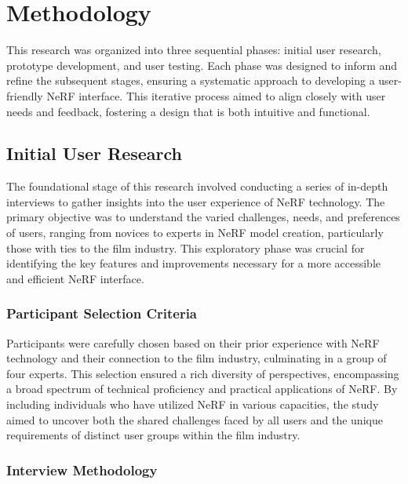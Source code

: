 %
\chapter{Methodology}
\label{sec:methodology}

This research was organized into three sequential phases: initial user research, prototype development, and user testing. 
Each phase was designed to inform and refine the subsequent stages, ensuring a systematic approach to developing a user-friendly NeRF interface. 
This iterative process aimed to align closely with user needs and feedback, fostering a design that is both intuitive and functional.

\section{Initial User Research}
\label{sec:methodology:user-research}

The foundational stage of this research involved conducting a series of in-depth interviews to gather insights into the user experience of NeRF technology. 
The primary objective was to understand the varied challenges, needs, and preferences of users, ranging from novices to experts in NeRF model creation, particularly those with ties to the film industry. 
This exploratory phase was crucial for identifying the key features and improvements necessary for a more accessible and efficient NeRF interface.

\subsection*{Participant Selection Criteria}
\label{sec:methodology:user-research:criteria}

Participants were carefully chosen based on their prior experience with NeRF technology and their connection to the film industry, culminating in a group of four experts. 
This selection ensured a rich diversity of perspectives, encompassing a broad spectrum of technical proficiency and practical applications of NeRF. 
By including individuals who have utilized NeRF in various capacities, the study aimed to uncover both the shared challenges faced by all users and the unique requirements of distinct user groups within the film industry.

\subsection*{Interview Methodology}
\label{sec:methodology:user-research:interview}

